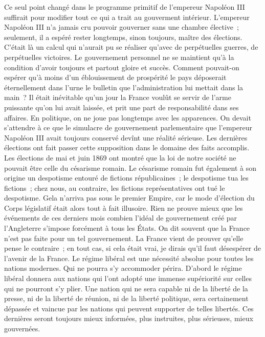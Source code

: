 \documentclass[french,twoside]{book} %
\begin{document}
Ce seul point changé dans le programme primitif de l’empereur Napoléon III suffirait pour modifier tout ce qui a trait au gouverment intérieur. L’empereur Napoléon III n’a jamais cru pouvoir gouverner sans une chambre élective ; seulement, il a espéré rester longtemps, sinon toujours, maître des élections. C’était là un calcul qui n’aurait pu se réaliser qu’avec de perpétuelles guerres, de perpétuelles victoires. Le gouvernement personnel ne se maintient qu’à la condition d’avoir toujours et partout gloire et succès. Comment pouvait-on espérer qu’à moins d’un éblouissement de prospérité le pays déposerait éternellement dans l’urne le bulletin que l’administration lui mettait dans la main ? Il était inévitable qu’un jour la France voulût se servir de l’arme puissante qu’on lui avait laissée, et prit une part de responsabilité dans ses affaires. En politique, on ne joue pas longtemps avec les apparences. On devait s’attendre à ce que le simulacre de gouvernement parlementaire que l’empereur Napoléon III avait toujours conservé devînt une réalité sérieuse. Les dernières élections ont fait passer cette supposition dans le domaine des faits accomplis. Les élections de mai et juin 1869 ont montré que la loi de notre société ne pouvait être celle du césarisme romain. Le césarisme romain fut également à son origine un despotisme entouré de fictions républicaines ; le despotisme tua les fictions ; chez nous, au contraire, les fictions représentatives ont tué le despotisme. Gela n’arriva pas sous le premier Empire, car le mode d’élection du Corps législatif était alors tout à fait illusoire. Rien ne prouve mieux que les événements de ces derniers mois combien l’idéal de gouvernement créé par l’Angleterre s’impose forcément à tous les États. On dit souvent que la France n’est pas faite pour un tel gouvernement. La France vient de prouver qu’elle pense le contraire ; en tout cas, si cela était vrai, je dirais qu’il faut désespérer de l’avenir de la France. Le régime libéral est une nécessité absolue pour toutes les nations modernes. Qui ne pourra s’y accommoder périra. D’abord le régime libéral donnera aux nations qui l’ont adopté une immense supériorité sur celles qui ne pourront s’y plier. Une nation qui ne sera capable ni de la liberté de la presse, ni de la liberté de réunion, ni de la liberté politique, sera certainement dépassée et vaincue par les nations qui peuvent supporter de telles libertés. Ces dernières seront toujours mieux informées, plus instruites, plus sérieuses, mieux gouvernées.\par
\end{document}
